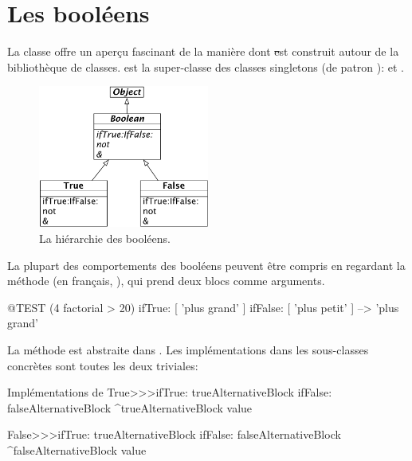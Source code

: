 \documentclass[a4paper,10pt,twoside]{book}
\begin{document}

\section{Les booléens}

La classe  offre un aperçu fascinant de la
manière dont \st est construit autour de la bibliothèque de classes. 
 est la super-classe  des classes
singletons (de patron ):  et .

\begin{figure}[ht]
	{\centerline {\includegraphics[width=0.5\textwidth]{BooleanHierarchy}}}
\caption{La hiérarchie des booléens.}
\end{figure}

La plupart des comportements des booléens peuvent être compris en
regardant la méthode  (en
français, ), qui prend deux blocs
comme arguments.

\begin{code}{@TEST}
(4 factorial > 20) ifTrue: [ 'plus grand' ] ifFalse: [ 'plus petit' ] --> 'plus grand'
\end{code}

La méthode est abstraite dans .
Les implémentations dans les sous-classes concrètes sont toutes les deux triviales:

\begin{method}{Implémentations de }
True>>>ifTrue: trueAlternativeBlock ifFalse: falseAlternativeBlock 
    ^trueAlternativeBlock value

False>>>ifTrue: trueAlternativeBlock ifFalse: falseAlternativeBlock 
    ^falseAlternativeBlock value
\end{method}
\end{document}
